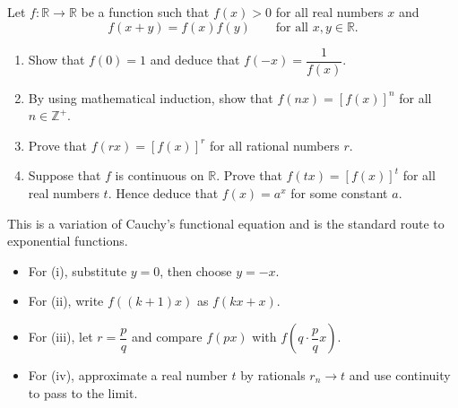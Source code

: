 
\begin{problem}
Let $f:\mathbb{R}\to\mathbb{R}$ be a function such that $f(x)>0$ for all real numbers $x$ and
\[
f(x+y)=f(x)f(y)
\qquad \text{for all } x,y\in\mathbb{R}.
\]

\begin{enumerate}[label=(\roman*)]
    \item Show that $f(0)=1$ and deduce that $f(-x)=\dfrac{1}{f(x)}$.
    \item By using mathematical induction, show that $f(nx)=[f(x)]^n$ for all $n\in\mathbb{Z}^+$.
    \item Prove that $f(rx)=[f(x)]^r$ for all rational numbers $r$.
    \item Suppose that $f$ is continuous on $\mathbb{R}$. Prove that $f(tx)=[f(x)]^t$ for all real numbers $t$. Hence deduce that $f(x)=a^x$ for some constant $a$.
\end{enumerate}
\end{problem}

\begin{hint}
This is a variation of Cauchy's functional equation and is the standard route to exponential functions.
\begin{itemize}[leftmargin=*]
    \item For (i), substitute $y=0$, then choose $y=-x$.
    \item For (ii), write $f((k+1)x)$ as $f(kx+x)$.
    \item For (iii), let $r=\dfrac{p}{q}$ and compare $f(px)$ with $f\!\left(q\cdot \dfrac{p}{q}x\right)$.
    \item For (iv), approximate a real number $t$ by rationals $r_n\to t$ and use continuity to pass to the limit.
\end{itemize}
\end{hint}

